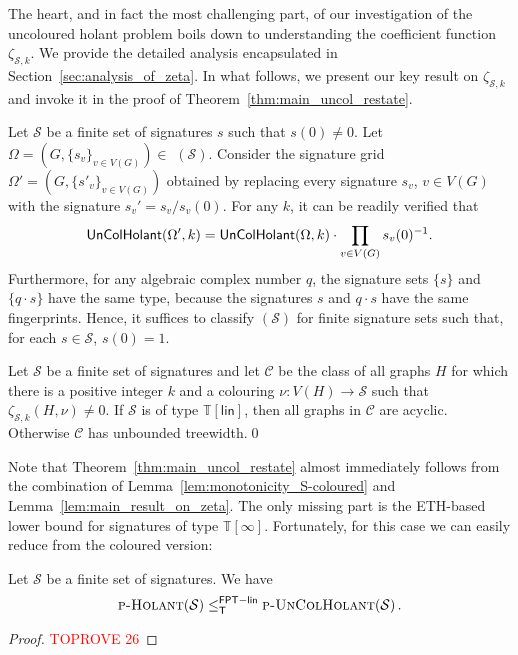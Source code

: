 \documentclass[authorcolumns,numberwithinsect]{no-lipics-v2022}
\newcommand{\fptlinred}{\leq^{\mathsf{FPT-lin}}_{\mathsf{T}}}
\newcommand{\holantprob}{\text{\sc{p-Holant}}}
\begin{document}
The heart, and in fact the most challenging part, of our investigation of the uncoloured holant problem boils down to understanding the coefficient function $\zeta_{\mathcal{S},k}$. We provide the detailed analysis encapsulated in Section~\ref{sec:analysis_of_zeta}. In what follows, we present our key result on $\zeta_{\mathcal{S},k}$ and invoke it in the proof of Theorem~\ref{thm:main_uncol_restate}.

\begin{remark}[On $s(0)=1$]\label{rem:s_zero_equals_1}
Let $\mathcal{S}$ be a finite set of signatures $s$ such that $s(0) \neq 0$. Let $\Omega = (G, \{s_v\}_{v\in V(G)}) \in$ $(\mathcal{S})$. Consider the signature grid $\Omega' = (G, \{s'_v\}_{v \in V(G)})$ obtained by replacing every signature $s_v$, $v \in V(G)$ with the signature $s_v' = s_v/s_v(0)$. For any $k$, it can be readily verified that 
\[\textup{\textsf{UnColHolant}}(\Omega', k) = \textup{\textsf{UnColHolant}}(\Omega, k) \cdot \prod_{v \in V(G)}s_v(0)^{-1}.\] 
Furthermore, for any algebraic complex number $q$, the signature sets $\{s\}$ and $\{q\cdot s\}$ have the same type, because the signatures $s$ and $q\cdot s$ have the same fingerprints. Hence, it suffices to classify $(\mathcal{S})$ for finite signature sets such that, for each $s \in \mathcal{S}$, $s(0) = 1$.
\end{remark}

\begin{lemma}\label{lem:main_result_on_zeta}
    Let $\mathcal{S}$ be a finite set of signatures and let $\mathcal{C}$ be the class of all graphs $H$ for which there is a positive integer $k$ and a colouring $\nu:V(H)\to \mathcal{S}$ such that $\zeta_{\mathcal{S},k}(H,\nu)\neq 0$. If $\mathcal{S}$ is of type $\mathbb{T}[\mathsf{lin}]$, then all graphs in $\mathcal{C}$ are acyclic. Otherwise $\mathcal{C}$ has unbounded treewidth.\qed
\end{lemma}

Note that Theorem~\ref{thm:main_uncol_restate} almost immediately follows from the combination of Lemma~\ref{lem:monotonicity_S-coloured} and Lemma~\ref{lem:main_result_on_zeta}. The only missing part is the ETH-based lower bound for signatures of type $\mathbb{T}[\infty]$. Fortunately, for this case we can easily reduce from the coloured version:

\begin{lemma}\label{lem:col_to_uncol}
    Let $\mathcal{S}$ be a finite set of signatures. We have 
    \[ \holantprob(\mathcal{S}) \fptlinred \text{\sc{p-UnColHolant}}(\mathcal{S})\,.\]
\end{lemma}
\begin{proof}\textcolor{red}{TOPROVE 26}\end{proof}
\end{document}

